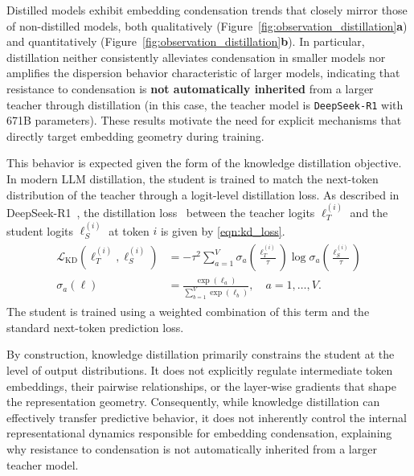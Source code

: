 \documentclass{article}
\theoremstyle{plain}
\theoremstyle{definition}
\theoremstyle{remark}
\begin{document}
Distilled models exhibit embedding condensation trends that closely mirror those of non-distilled models, both qualitatively (Figure~\ref{fig:observation_distillation}\textbf{a}) and quantitatively (Figure~\ref{fig:observation_distillation}\textbf{b}). In particular, distillation neither consistently alleviates condensation in smaller models nor amplifies the dispersion behavior characteristic of larger models, indicating that resistance to condensation is \textbf{not automatically inherited} from a larger teacher through distillation (in this case, the teacher model is \texttt{DeepSeek-R1} with 671B parameters). These results motivate the need for explicit mechanisms that directly target embedding geometry during training.

This behavior is expected given the form of the knowledge distillation objective. In modern LLM distillation, the student is trained to match the next-token distribution of the teacher through a logit-level distillation loss. As described in DeepSeek-R1~\cite{DeepSeek}, the distillation loss~\cite{KD_loss_DeepSeek} between the teacher logits $\ell_T^{(i)}$ and the student logits $\ell_S^{(i)}$ at token $i$ is given by \eqref{eqn:kd_loss}.
\begin{align}
\begin{split}
\label{eqn:kd_loss}
\mathcal{L}_{\mathrm{KD}} (\ell_T^{(i)}, \ell_S^{(i)}) 
&=
-\tau^2 \sum_{a=1}^{V}
\sigma_a \left(\frac{\ell_T^{(i)}}{\tau}\right)
\log \sigma_a \left(\frac{\ell_S^{(i)}}{\tau}\right)\\
\sigma_a(\ell)
&=
\frac{\exp(\ell_a)}{\sum_{b=1}^{V} \exp(\ell_b)},
\quad a = 1,\ldots,V.
\end{split}
\end{align}
The student is trained using a weighted combination of this term and the standard next-token prediction loss.

By construction, knowledge distillation primarily constrains the student at the level of output distributions. It does not explicitly regulate intermediate token embeddings, their pairwise relationships, or the layer-wise gradients that shape the representation geometry. Consequently, while knowledge distillation can effectively transfer predictive behavior, it does not inherently control the internal representational dynamics responsible for embedding condensation, explaining why resistance to condensation is not automatically inherited from a larger teacher model.
\end{document}
